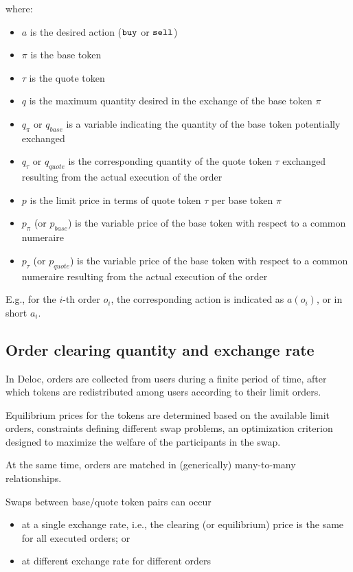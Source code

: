 \documentclass[11pt, reqno]{amsart}
\theoremstyle{definition}
\theoremstyle{remark}
\newcommand{\buy}{\textnormal{\texttt{buy}}}
\newcommand{\sell}{\textnormal{\texttt{sell}}}
\begin{document}
where:
\begin{itemize}
	\item $a$ is the desired action ($\buy$ or $\sell$)
    \item $\pi$ is the base token
    \item $\tau$ is the quote token
    \item $q$ is the maximum quantity desired in the exchange of the base token
          $\pi$
    \item $q_{\pi}$ or $q_{base}$ is a variable indicating the quantity of the base token
          potentially exchanged
    \item $q_{\tau}$ or $q_{quote}$ is the corresponding quantity of the quote
          token $\tau$ exchanged resulting from the actual execution of the order
	\item $p$ is the limit price in terms of quote token $\tau$ per base token $\pi$
    \item $p_{\pi}$ (or $p_{base}$) is the variable price of the base token with respect to a common
          numeraire
    \item $p_{\tau}$ (or $p_{quote}$) is the variable price of the base token
          with respect to a common numeraire resulting from the actual execution of
          the order 
\end{itemize}

E.g., for the $i$-th order $o_i$, the corresponding action is indicated as
$a(o_i)$, or in short $a_i$.

\subsection{Order clearing quantity and exchange rate}
In Deloc, orders are collected from users during a finite period of time,
after which tokens are redistributed among users according to their limit
orders.

Equilibrium prices for the tokens are determined based on the available limit
orders, constraints defining different swap problems, an optimization criterion
designed to maximize the welfare of the participants in the swap.

At the same time, orders are matched in (generically) many-to-many relationships.

Swaps between base/quote token pairs can occur
\begin{itemize}
  \item at a single exchange rate, i.e., the
clearing (or equilibrium) price is the same for all executed orders; or
  \item at different exchange rate for different orders
\end{itemize}
\end{document}
